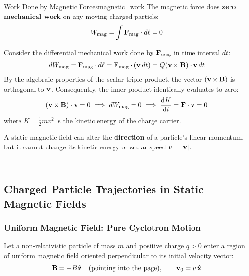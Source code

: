 \begin{theorem}{Work Done by Magnetic Forces}{magnetic_work}
The magnetic force does \textbf{zero mechanical work} on any moving charged particle:
\begin{equation}
    W_{\mathrm{mag}} = \int \vb{F}_{\mathrm{mag}} \cdot d\vb{\ell} = 0
\end{equation}
\end{theorem}

\begin{proofbox}
Consider the differential mechanical work done by $\vb{F}_{\mathrm{mag}}$ in time interval $dt$:
\begin{equation}
    dW_{\mathrm{mag}} = \vb{F}_{\mathrm{mag}} \cdot d\vb{\ell} = \vb{F}_{\mathrm{mag}} \cdot (\vb{v}\,dt) = Q\qty(\vb{v} \times \vb{B}) \cdot \vb{v}\,dt
\end{equation}
By the algebraic properties of the scalar triple product, the vector $(\vb{v} \times \vb{B})$ is orthogonal to $\vb{v}$. Consequently, the inner product identically evaluates to zero:
\begin{equation}
    (\vb{v} \times \vb{B}) \cdot \vb{v} = 0 \implies dW_{\mathrm{mag}} = 0 \implies \dv{K}{t} = \vb{F} \cdot \vb{v} = 0
\end{equation}
where $K = \frac{1}{2}m v^2$ is the kinetic energy of the charge carrier.
\end{proofbox}

\begin{remark}
A static magnetic field can alter the \textbf{direction} of a particle's linear momentum, but it cannot change its kinetic energy or scalar speed $v = \abs{\vb{v}}$.
\end{remark}

---

\subsection{Charged Particle Trajectories in Static Magnetic Fields}
\label{sec:particle_trajectories}

\subsubsection{Uniform Magnetic Field: Pure Cyclotron Motion}

Let a non-relativistic particle of mass $m$ and positive charge $q > 0$ enter a region of uniform magnetic field oriented perpendicular to its initial velocity vector:
\begin{equation}
    \vb{B} = -B\,\vu{z} \quad (\text{pointing into the page}), \qquad \vb{v}_0 = v\,\vu{x}
\end{equation}

